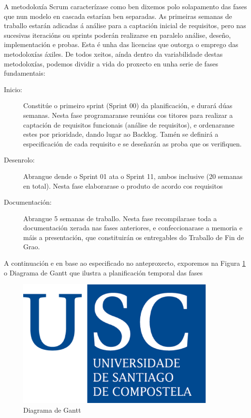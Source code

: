 A metodoloxía Scrum caracterízase como ben dixemos polo solapamento das fases que nun modelo en cascada estarían ben separadas. As primeiras semanas de traballo estarán adicadas á análise para a captación inicial de requisitos, pero nas sucesivas iteracións ou sprints poderán realizarse en paralelo análise, deseño, implementación e probas. Esta é unha das licencias que outorga o emprego das metodoloxías áxiles. De todos xeitos, aínda dentro da variabilidade destas metodoloxías, podemos dividir a vida do proxecto en unha serie de fases fundamentais:
\begin{description}
\item[Inicio:] Constitúe o primeiro sprint (Sprint 00) da planificación, e durará dúas semanas. Nesta fase programaranse reunións cos titores para realizar a captación de requisitos funcionais (análise de requisitos), e ordenaranse estes por prioridade, dando lugar ao Backlog. Tamén se definirá a especificación de cada requisito e se deseñarán as proba que os verifiquen.
\item[Desenrolo:] Abrangue dende o Sprint 01 ata o Sprint 11, ambos inclusive (20 semanas en total). Nesta fase elaborarase o produto de acordo cos requisitos
\item[Documentación:] Abrangue 5 semanas de traballo. Nesta fase recompilarase toda a documentación xerada nas fases anteriores, e confeccionarase a memoria e máis a presentación, que constituirán os entregables do Traballo de Fin de Grao.
\end{description}

A continuación e en base ao especificado no anteproxecto, exporemos na Figura \ref{gantt} o Diagrama de Gantt que ilustra a planificación temporal das fases

\begin{figure}
\centering
\includegraphics[width=10cm]{figuras/logo_usc} %
\caption{Diagrama de Gantt}
\label{gantt}
\end{figure}

